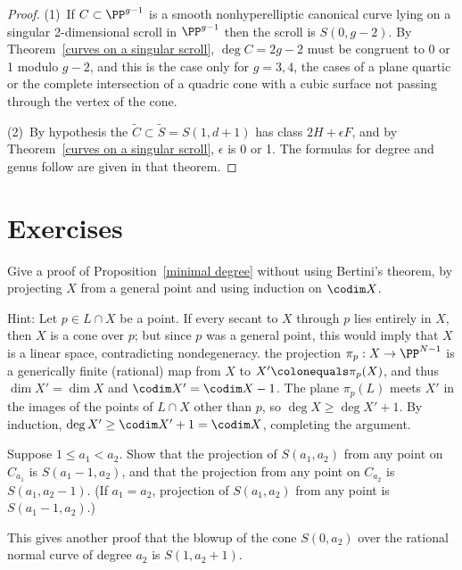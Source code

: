 \begin{proof} (1)\, If $C\subset \PP^{g-1}$ is a smooth nonhyperelliptic
canonical curve lying on a singular 2-dimensional scroll in $\PP^{g-1}$
then the scroll is $S(0, g-2)$. By Theorem~\ref{curves on a singular
scroll}, $\deg C = 2g-2$ must be congruent
to 0 or 1 modulo $g-2$, and this is the case only for $g=3,4$, the cases
of a plane quartic or the complete intersection
of a quadric cone with a cubic surface not passing through the vertex
of the cone.

\noindent
(2)\, By hypothesis the 
%
$\tilde C\subset  \tilde S = S(1, d+1)$
has class $2H+\epsilon F$,  and by Theorem~\ref{curves on a singular
scroll}, $\epsilon$ is 0 or 1.
The formulas for degree and genus follow are given in that theorem.
\end{proof}

\section{Exercises}

\begin{exercise}
Give a proof of Proposition~\ref{minimal degree} without using
Bertini's theorem, by projecting $X$ from a general point and using
induction on $\codim X$.

Hint: Let $p\in L\cap X$ be a point. If every secant to $X$ through
$p$ lies entirely in $X$, then $X$ is a cone over $p$; but since $p$
was a general point, this would imply that $X$ is a linear space,
contradicting nondegeneracy.
the projection $\pi_{p}:X \to \PP^{N-1}$ is a generically
finite (rational) map from $X$ to $X' \colonequals  \pi_{p}(X)$,
and thus $\dim X' = \dim X$ and $\codim X' = \codim X-1$. The plane
$\pi_{p}(L)$ meets $X'$ in the images of the points of $L\cap X$ other
than $p$, so
$\deg X\geq \deg X'+1$. By induction, $\deg X' \geq \codim X'+1 = \codim
X$, completing the argument.
\end{exercise}

\begin{exercise}\label{special projections}
Suppose $1\leq a_1 < a_2$. Show that the projection of $S(a_1,a_2)$
from any point on $C_{a_1}$ is
$S(a_1-1, a_2)$, and that the projection from any point on $C_{a_2}$
is $S(a_1, a_2-1)$. (If $a_1 = a_2$, projection of $S(a_1,a_2)$ from
any point is $S(a_1-1, a_2)$.)

This gives another proof that the blowup of the cone $S(0,a_2)$ over
the rational normal curve of degree $a_2$ is $S(1,a_2+1)$.
\end{exercise}

